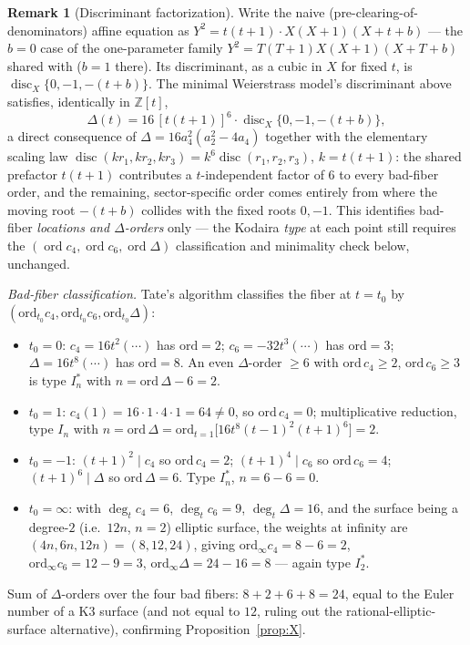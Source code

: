 \documentclass[11pt]{amsart}
\theoremstyle{definition}
\newtheorem{remark}[theorem]{Remark}
\newcommand{\Z}{\mathbb{Z}}
\begin{document}
\begin{remark}[Discriminant factorization]
\label{rem:disc-factorization}
Write the naive (pre-clearing-of-denominators) affine equation as $Y^2=t(t{+}1)\cdot X(X{+}1)(X{+}t{+}b)$ — the $b=0$ case of the one-parameter family $Y^2=T(T{+}1)X(X{+}1)(X{+}T{+}b)$ shared with \cite{ClassIII} ($b=1$ there). Its discriminant, as a cubic in $X$ for fixed $t$, is $\operatorname{disc}_X\{0,-1,-(t{+}b)\}$. The minimal Weierstrass model's discriminant above satisfies, identically in $\Z[t]$,
\[
\Delta(t)=16\,[t(t{+}1)]^6\cdot\operatorname{disc}_X\{0,-1,-(t{+}b)\},
\]
a direct consequence of $\Delta=16a_4^2(a_2^2{-}4a_4)$ together with the elementary scaling law $\operatorname{disc}(kr_1,kr_2,kr_3)=k^6\operatorname{disc}(r_1,r_2,r_3)$, $k=t(t{+}1)$: the shared prefactor $t(t{+}1)$ contributes a $t$-independent factor of $6$ to every bad-fiber order, and the remaining, sector-specific order comes entirely from where the moving root $-(t{+}b)$ collides with the fixed roots $0,-1$. This identifies bad-fiber \emph{locations and $\Delta$-orders} only — the Kodaira \emph{type} at each point still requires the $(\operatorname{ord}c_4,\operatorname{ord}c_6,\operatorname{ord}\Delta)$ classification and minimality check below, unchanged.
\end{remark}

\emph{Bad-fiber classification.} Tate's algorithm classifies the fiber at $t=t_0$ by
$(\mathrm{ord}_{t_0}c_4,\mathrm{ord}_{t_0}c_6,\mathrm{ord}_{t_0}\Delta)$:
\begin{itemize}
\item $t_0=0$: $c_4=16t^2(\cdots)$ has $\mathrm{ord}=2$; $c_6=-32t^3(\cdots)$ has $\mathrm{ord}=3$; $\Delta=16t^8(\cdots)$ has $\mathrm{ord}=8$. An even $\Delta$-order $\ge6$ with $\mathrm{ord}\,c_4\ge2$, $\mathrm{ord}\,c_6\ge3$ is type $I_n^*$ with $n=\mathrm{ord}\,\Delta-6=2$.
\item $t_0=1$: $c_4(1)=16\cdot1\cdot4\cdot1=64\ne0$, so $\mathrm{ord}\,c_4=0$; multiplicative reduction, type $I_n$ with $n=\mathrm{ord}\,\Delta=\mathrm{ord}_{t=1}\bigl[16t^8(t-1)^2(t+1)^6\bigr]=2$.
\item $t_0=-1$: $(t+1)^2\mid c_4$ so $\mathrm{ord}\,c_4=2$; $(t+1)^4\mid c_6$ so $\mathrm{ord}\,c_6=4$; $(t+1)^6\mid\Delta$ so $\mathrm{ord}\,\Delta=6$. Type $I_n^*$, $n=6-6=0$.
\item $t_0=\infty$: with $\deg_tc_4=6$, $\deg_tc_6=9$, $\deg_t\Delta=16$, and the surface being a degree-$2$ (i.e.\ $12n$, $n=2$) elliptic surface, the weights at infinity are $(4n,6n,12n)=(8,12,24)$, giving $\mathrm{ord}_\infty c_4=8-6=2$, $\mathrm{ord}_\infty c_6=12-9=3$, $\mathrm{ord}_\infty\Delta=24-16=8$ — again type $I_2^*$.
\end{itemize}
Sum of $\Delta$-orders over the four bad fibers: $8+2+6+8=24$, equal to the Euler number of a K3 surface (and not equal to $12$, ruling out the rational-elliptic-surface alternative), confirming Proposition~\ref{prop:X}.
\end{document}
